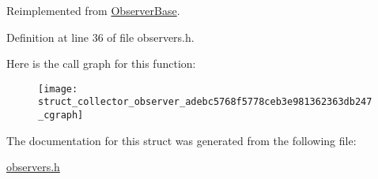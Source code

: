 Reimplemented from \hyperlink{struct_observer_base_adeede05d3ddea8da1148cdce92f07787}{Observer\+Base}.



Definition at line 36 of file observers.\+h.



Here is the call graph for this function\+:
\nopagebreak
\begin{figure}[H]
\begin{center}
\leavevmode
\texttt{[image: struct\_collector\_observer\_adebc5768f5778ceb3e981362363db247\_cgraph]}
\end{center}
\end{figure}




The documentation for this struct was generated from the following file\+:\begin{DoxyCompactItemize}
\item 
\hyperlink{observers_8h}{observers.\+h}\end{DoxyCompactItemize}
